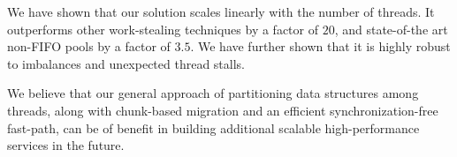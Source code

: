 \documentclass{sig-alternate}
\begin{document}
We have shown that our solution scales linearly with the number
of threads. It outperforms other work-stealing techniques by a
factor of $20$, and state-of-the art non-FIFO pools by a factor of $3.5$.
We have further shown that it is highly robust to imbalances and
unexpected thread stalls.

We believe that our general approach of partitioning data structures
among threads, along with chunk-based migration and an efficient
synchronization-free fast-path, can be of benefit in building
additional scalable high-performance services in the future.



%
%
%
%
%
\end{document}
